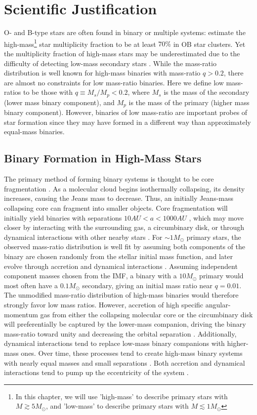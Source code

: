 \documentclass[11pt]{report}     %
\begin{document}
\section{Scientific Justification}
O- and B-type stars are often found in binary or
multiple systems: \cite{Mason2009} estimate the high-mass\footnote{In
 this chapter, we will use 'high-mass' to describe primary stars with $M \gtrsim 5M_{\odot}$,
 and 'low-mass' to describe primary stars with $M\lesssim 1 M_{\odot}$} star multiplicity
fraction to be at least $70\%$ in OB star clusters. Yet the multiplicity fraction of high-mass stars may be underestimated due to the difficulty of detecting low-mass secondary stars \citep{Sana2011}.  While the mass-ratio distribution
is well known for high-mass binaries with mass-ratio $q > 0.2$, there are almost no
constraints for low mass-ratio binaries. Here we define low
mass-ratios to be those with $q \equiv M_s/M_p < 0.2$, where $M_s$
is the mass of the secondary (lower mass binary component), and
$M_p$ is the mass of the primary (higher mass binary component).
However, binaries of low mass-ratio are important probes of star formation since they may have
formed in a different way than approximately equal-mass binaries.


\subsection{Binary Formation in High-Mass Stars}
\label{sec:formation}
The primary method of forming binary systems is thought to be core fragmentation
\citep[see e.g.][]{Boss1979, Boss1986, Bate1995}. As a molecular cloud
begins isothermally collapsing, its density increases, causing the
Jeans mass to decrease. Thus, an initially Jeans-mass collapsing core
can fragment into smaller objects. Core fragmentation will initially yield binaries with separations
$10 AU < a < 1000 AU$ , which may move closer by interacting
with the surrounding gas, a circumbinary disk, or through dynamical
interactions with other nearby stars \citep{BBB2002}. For $\sim 1
M_{\odot}$ primary stars, the observed mass-ratio distribution is well fit by assuming
both components of the binary are chosen randomly from the stellar
initial mass function, and later evolve through
accretion and dynamical interactions \citep{Kroupa2003}. Assuming
independent component masses chosen from the IMF, a binary with a $10 M_{\odot}$ primary would
most often have a $0.1 M_{\odot}$ secondary, giving an initial mass
ratio near $q=0.01$. The unmodified mass-ratio distribution of
high-mass binaries would therefore strongly favor low mass
ratios. However, accretion of high specific angular-momentum gas
from either the collapsing molecular core or
the circumbinary disk will preferentially be captured by the
lower-mass companion, driving the binary mass-ratio toward unity and
decreasing the orbital separation
\citep{Bate2000, BonnellBate2005}. Additionally, dynamical
interactions tend to replace low-mass binary companions with higher-mass ones.
Over time, these processes tend to create high-mass binary systems 
with nearly equal masses and small separations \citep{BBB2002}. Both
accretion and dynamical interactions tend to pump up the eccentricity
of the system \citep{BonnellBate2005}.
\end{document}
